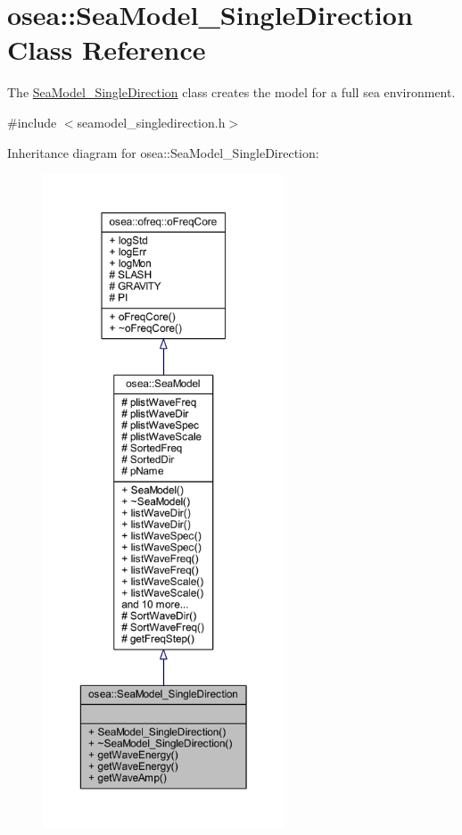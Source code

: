 \hypertarget{classosea_1_1_sea_model___single_direction}{\section{osea\-:\-:Sea\-Model\-\_\-\-Single\-Direction Class Reference}
\label{classosea_1_1_sea_model___single_direction}
}


The \hyperlink{classosea_1_1_sea_model___single_direction}{Sea\-Model\-\_\-\-Single\-Direction} class creates the model for a full sea environment.  




{\ttfamily \#include $<$seamodel\-\_\-singledirection.\-h$>$}



Inheritance diagram for osea\-:\-:Sea\-Model\-\_\-\-Single\-Direction\-:
\nopagebreak
\begin{figure}[H]
\begin{center}
\leavevmode
\includegraphics[height=550pt]{classosea_1_1_sea_model___single_direction__inherit__graph}
\end{center}
\end{figure}
